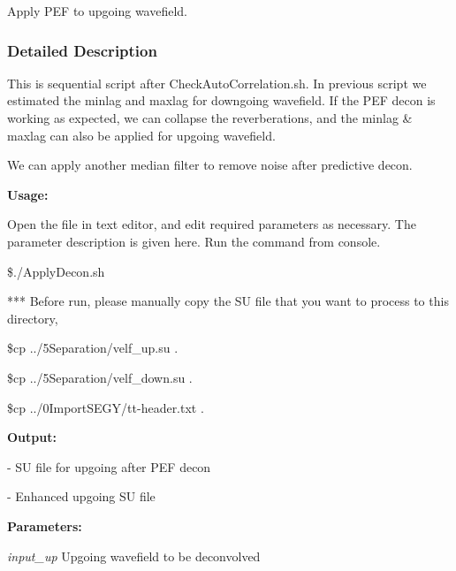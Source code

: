 \documentclass{article}
\begin{document}
\vspace{12pt}
Apply PEF to upgoing wavefield. 

\vspace{24pt}
\subsubsection*{\textbf{Detailed Description}}

\vspace{1pt}
This is sequential script after CheckAutoCorrelation.sh. In previous script we 
estimated the minlag and maxlag for downgoing wavefield. If the PEF decon is working 
as expected, we can collapse the reverberations, and the minlag \& maxlag can also 
be applied for upgoing wavefield.

\vspace{1pt}
We can apply another median filter to remove noise after predictive decon.

\vspace{4pt}
\textbf{Usage:}

\vspace{4pt}
Open the file in text editor, and edit required parameters as necessary. The parameter 
description is given here. Run the command from console. 

\vspace{4pt}
\$./ApplyDecon.sh 

\vspace{16pt}
*** Before run, please manually copy the SU file that you want to process to this 
directory, 

\vspace{4pt}
\$cp ../5Separation/velf\_up.su .

\vspace{4pt}
\$cp ../5Separation/velf\_down.su .

\vspace{4pt}
\$cp ../0ImportSEGY/tt-header.txt .

\vspace{16pt}
\textbf{Output:}

\vspace{4pt}
- SU file for upgoing after PEF decon

\vspace{4pt}
- Enhanced upgoing SU file

\vspace{4pt}
\textbf{Parameters:}

\vspace{4pt}
\textit{input\_up} Upgoing wavefield to be deconvolved 
\end{document}
